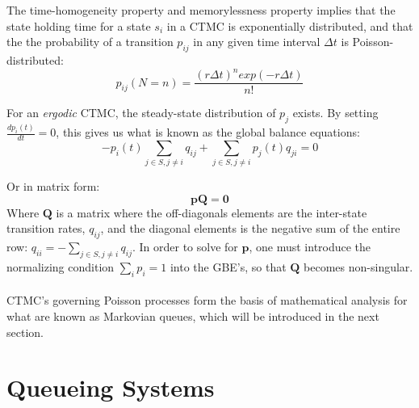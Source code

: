 The time-homogeneity property and memorylessness property implies that the state holding time for a state \(s_i\) in a CTMC is exponentially distributed, and that the the probability of a transition \(p_{ij}\) in any given time interval \(\Delta t\) is Poisson-distributed:
\[p_{ij}(N=n) = \frac{(r \Delta t)^n exp(-r \Delta t)}{n!}\]

For an \textit{ergodic} CTMC, the steady-state distribution of \(p_j\) exists. By setting \(\frac{dp_i(t)}{dt} = 0\), this gives us what is known as the global balance equations:
\begin{equation}\label{eq:global_balance_equations}
  -p_i(t) \sum _ {j \in S, j \neq i}q_{ij} + \sum_{j\in S, j \neq i} p_j(t)q_{ji} = 0  
\end{equation}

Or in matrix form:
\[\mathbf{pQ=0}\]
Where \(\mathbf{Q}\) is a matrix where the off-diagonals elements are the inter-state transition rates, \(q_{ij}\), and the diagonal elements is the negative sum of the entire row: \(q_{ii} = -\sum _ {j \in S, j \neq i}q_{ij}\). In order to solve for \(\mathbf{p}\), one must introduce the normalizing condition \(\sum_i p_i = 1\) into the GBE's, so that \(\mathbf{Q}\) becomes non-singular.
\\\\
CTMC's governing Poisson processes form the basis of mathematical analysis for what are known as Markovian queues, which will be introduced in the next section.

\section{Queueing Systems}\label{sec:QueueingSystems}

